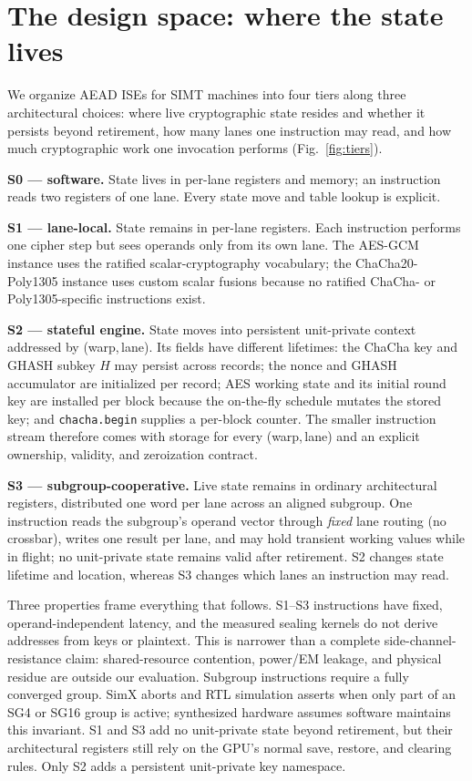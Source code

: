 \documentclass[conference]{IEEEtran}
\begin{document}
\section{The design space: where the state lives}\label{sec:space}

We organize AEAD ISEs for SIMT machines into four tiers along three
architectural choices: where live cryptographic state resides and whether it
persists beyond retirement, how many lanes one instruction may read, and how
much cryptographic work one invocation performs (Fig.~\ref{fig:tiers}).

\textbf{S0 --- software.} State lives in per-lane registers and memory; an
instruction reads two registers of one lane. Every state move and table
lookup is explicit.

\textbf{S1 --- lane-local.} State remains in per-lane registers. Each
instruction performs one cipher step but sees operands only from its own
lane. The AES-GCM instance uses the ratified scalar-cryptography vocabulary;
the ChaCha20-Poly1305 instance uses custom scalar fusions because no ratified
ChaCha- or Poly1305-specific instructions exist.

\textbf{S2 --- stateful engine.} State moves into persistent unit-private
context addressed by (warp,\,lane). Its fields have different lifetimes:
the ChaCha key and GHASH subkey $H$ may persist across records; the nonce and
GHASH accumulator are initialized per record; AES working state and its
initial round key are installed per block because the on-the-fly schedule
mutates the stored key; and \texttt{chacha.begin} supplies a per-block
counter. The smaller instruction stream therefore comes with storage for
every (warp,\,lane) and an explicit ownership, validity, and zeroization
contract.

\textbf{S3 --- subgroup-cooperative.} Live state remains in ordinary
architectural registers, distributed one word per lane across an aligned
subgroup. One instruction reads the subgroup's operand vector through
\emph{fixed} lane routing (no crossbar), writes one result per lane, and may
hold transient working values while in flight; no unit-private state remains
valid after retirement. S2 changes state lifetime and location, whereas S3
changes which lanes an instruction may read.

Three properties frame everything that follows. S1--S3 instructions have
fixed, operand-independent latency, and the measured sealing kernels do not
derive addresses from keys or plaintext. This is narrower than a complete
side-channel-resistance claim: shared-resource contention, power/EM leakage,
and physical residue are outside our evaluation. Subgroup instructions
require a fully converged group. SimX aborts and RTL simulation asserts when
only part of an SG4 or SG16 group is active; synthesized hardware assumes
software maintains this invariant. S1 and S3 add no unit-private state beyond
retirement, but their architectural registers still rely on the GPU's normal
save, restore, and clearing rules. Only S2 adds a persistent unit-private key
namespace.
\end{document}
